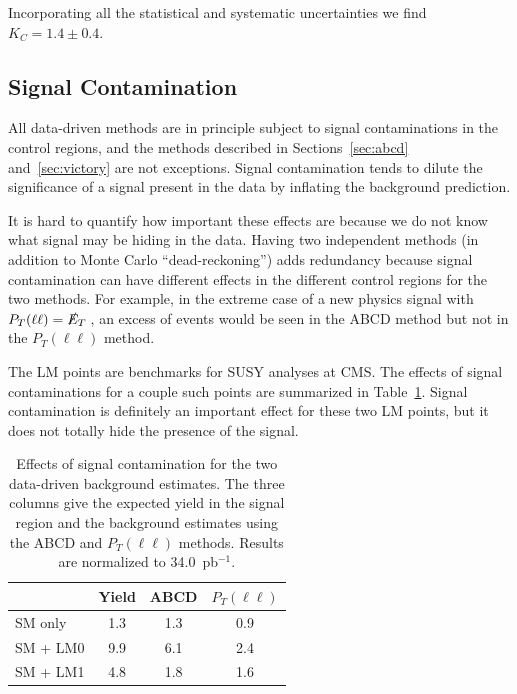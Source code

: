 Incorporating all the statistical and systematic uncertainties we find $K_C = 1.4 \pm 0.4$.

\subsection{Signal Contamination}
\label{sec:sigcont}

All data-driven methods are in principle subject to signal contaminations
in the control regions, and the methods described in 
Sections~\ref{sec:abcd} and~\ref{sec:victory} are not exceptions.
Signal contamination tends to dilute the significance of a signal
present in the data by inflating the background prediction.

It is hard to quantify how important these effects are because we 
do not know what signal may be hiding in the data.  Having two
independent methods (in addition to Monte Carlo ``dead-reckoning'')
adds redundancy because signal contamination can have different effects
in the different control regions for the two methods.
For example, in the extreme case of a
new physics signal 
with $P_T(\ell \ell) = \met$, an excess of events would be seen 
in the ABCD method but not in the $P_T(\ell \ell)$ method.


The LM points are benchmarks for SUSY analyses at CMS.  The effects
of signal contaminations for a couple such points are summarized
in Table~\ref{tab:sigcont}. Signal contamination is definitely an important
effect for these two LM points, but it does not totally hide the
presence of the signal.


\begin{table}[htb]
\begin{center}
\caption{\label{tab:sigcont} Effects of signal contamination 
for the two data-driven background estimates. The three columns give
the expected yield in the signal region and the background estimates
using the ABCD and $P_T(\ell \ell)$ methods. Results are normalized to 34.0~pb$^{-1}$.}
\begin{tabular}{lccc}
\hline
            &      Yield      &      ABCD    & $P_T(\ell \ell)$  \\
\hline
SM only     &       1.3      &      1.3    &       0.9        \\
SM + LM0    &       9.9      &      6.1    &       2.4        \\
SM + LM1    &       4.8      &      1.8    &       1.6        \\
\hline
\end{tabular}
\end{center}
\end{table}

